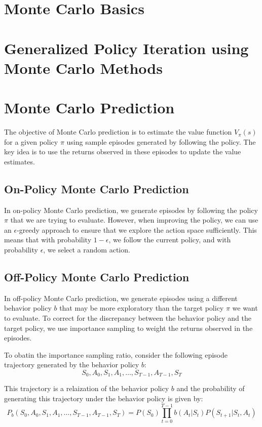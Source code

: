 \documentclass{article}
\begin{document}
\section{Monte Carlo Basics}


\section{Generalized Policy Iteration using Monte Carlo Methods}

\section{Monte Carlo Prediction}
\quad The objective of Monte Carlo prediction is to estimate the value function \( V_\pi(s) \) for a given policy \( \pi \) using sample episodes generated by following the policy. 
The key idea is to use the returns observed in these episodes to update the value estimates.


\subsection{On-Policy Monte Carlo Prediction}
\quad In on-policy Monte Carlo prediction, we generate episodes by following the policy \( \pi \) that we are trying to evaluate.
 However, when improving the policy, we can use an \(\epsilon\)-greedy approach to ensure that we explore the action space sufficiently. 
 This means that with probability \( 1 - \epsilon \), we follow the current policy, and with probability \( \epsilon \), we select a random action.

\subsection{Off-Policy Monte Carlo Prediction}
\quad In off-policy Monte Carlo prediction, we generate episodes using a different behavior policy \( b \) that may be more exploratory than the target policy \( \pi \) we want to evaluate. 
To correct for the discrepancy between the behavior policy and the target policy, we use importance sampling to weight the returns observed in the episodes. 

To obatin the importance sampling ratio, consider the following episode trajectory generated by the behavior policy \( b \):
\begin{equation}
S_0, A_0, S_1, A_1, \ldots, S_{T-1}, A_{T-1}, S_T
\end{equation}

This trajectory is a relaization of the behavior policy \( b \) and the probability of generating this trajectory under the behavior policy is given by:
\begin{equation}
P_b(S_0, A_0, S_1, A_1, \ldots, S_{T-1}, A_{T-1}, S_T) = P(S_0) \prod_{t=0}^{T-1} b(A_t | S_t) P(S_{t+1}| S_t, A_t)
\end{equation}
\end{document}
